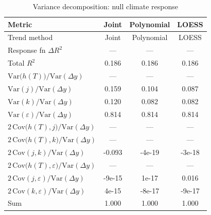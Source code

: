 \begin{table}[htbp]
\centering
\caption{Variance decomposition: null climate response}
\label{tab:variance_decomp_null}

\small
\begin{tabular}{@{}lccc@{}}
\toprule
Metric & Joint & Polynomial & LOESS \\
\midrule
Trend method & Joint & Polynomial & LOESS \\
\midrule
Response fn $\Delta R^2$ & — & — & — \\
Total $R^2$ & 0.186 & 0.186 & 0.186 \\
\midrule
$\mathrm{Var}\!\big(h(T)\big)/\mathrm{Var}(\Delta y)$ & — & — & — \\
$\mathrm{Var}(j)/\mathrm{Var}(\Delta y)$ & 0.159 & 0.104 & 0.087 \\
$\mathrm{Var}(k)/\mathrm{Var}(\Delta y)$ & 0.120 & 0.082 & 0.082 \\
$\mathrm{Var}(\varepsilon)/\mathrm{Var}(\Delta y)$ & 0.814 & 0.814 & 0.814 \\
\midrule
$2\,\mathrm{Cov}\!\big(h(T),j\big)/\mathrm{Var}(\Delta y)$ & — & — & — \\
$2\,\mathrm{Cov}\!\big(h(T),k\big)/\mathrm{Var}(\Delta y)$ & — & — & — \\
$2\,\mathrm{Cov}(j,k)/\mathrm{Var}(\Delta y)$ & -0.093 & -4e-19 & -3e-18 \\
$2\,\mathrm{Cov}\!\big(h(T),\varepsilon\big)/\mathrm{Var}(\Delta y)$ & — & — & — \\
$2\,\mathrm{Cov}(j,\varepsilon)/\mathrm{Var}(\Delta y)$ & -9e-15 & 1e-17 & 0.016 \\
$2\,\mathrm{Cov}(k,\varepsilon)/\mathrm{Var}(\Delta y)$ & 4e-15 & -8e-17 & -9e-17 \\
\midrule
Sum & 1.000 & 1.000 & 1.000 \\
\bottomrule
\end{tabular}
\end{table}